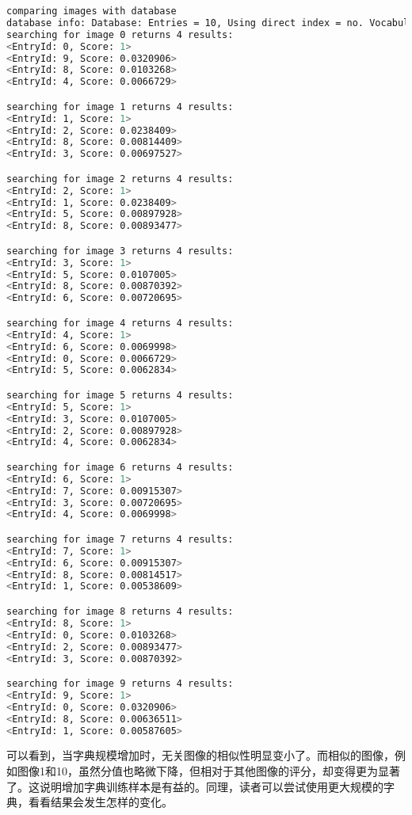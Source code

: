 \begin{lstlisting}[language=sh,caption=终端输出：]
comparing images with database 
database info: Database: Entries = 10, Using direct index = no. Vocabulary: k = 10, L = 5, Weighting = tf-idf, Scoring = L1-norm, Number of words = 99566
searching for image 0 returns 4 results:
<EntryId: 0, Score: 1>
<EntryId: 9, Score: 0.0320906>
<EntryId: 8, Score: 0.0103268>
<EntryId: 4, Score: 0.0066729>

searching for image 1 returns 4 results:
<EntryId: 1, Score: 1>
<EntryId: 2, Score: 0.0238409>
<EntryId: 8, Score: 0.00814409>
<EntryId: 3, Score: 0.00697527>

searching for image 2 returns 4 results:
<EntryId: 2, Score: 1>
<EntryId: 1, Score: 0.0238409>
<EntryId: 5, Score: 0.00897928>
<EntryId: 8, Score: 0.00893477>

searching for image 3 returns 4 results:
<EntryId: 3, Score: 1>
<EntryId: 5, Score: 0.0107005>
<EntryId: 8, Score: 0.00870392>
<EntryId: 6, Score: 0.00720695>

searching for image 4 returns 4 results:
<EntryId: 4, Score: 1>
<EntryId: 6, Score: 0.0069998>
<EntryId: 0, Score: 0.0066729>
<EntryId: 5, Score: 0.0062834>

searching for image 5 returns 4 results:
<EntryId: 5, Score: 1>
<EntryId: 3, Score: 0.0107005>
<EntryId: 2, Score: 0.00897928>
<EntryId: 4, Score: 0.0062834>

searching for image 6 returns 4 results:
<EntryId: 6, Score: 1>
<EntryId: 7, Score: 0.00915307>
<EntryId: 3, Score: 0.00720695>
<EntryId: 4, Score: 0.0069998>

searching for image 7 returns 4 results:
<EntryId: 7, Score: 1>
<EntryId: 6, Score: 0.00915307>
<EntryId: 8, Score: 0.00814517>
<EntryId: 1, Score: 0.00538609>

searching for image 8 returns 4 results:
<EntryId: 8, Score: 1>
<EntryId: 0, Score: 0.0103268>
<EntryId: 2, Score: 0.00893477>
<EntryId: 3, Score: 0.00870392>

searching for image 9 returns 4 results:
<EntryId: 9, Score: 1>
<EntryId: 0, Score: 0.0320906>
<EntryId: 8, Score: 0.00636511>
<EntryId: 1, Score: 0.00587605>
\end{lstlisting}

可以看到，当字典规模增加时，无关图像的相似性明显变小了。而相似的图像，例如图像1和10，虽然分值也略微下降，但相对于其他图像的评分，却变得更为显著了。这说明增加字典训练样本是有益的。同理，读者可以尝试使用更大规模的字典，看看结果会发生怎样的变化。

